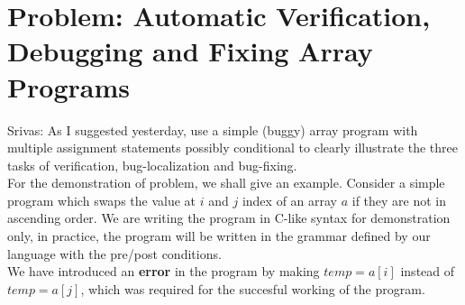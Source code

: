 \documentclass[a4paper, 12pt, notitlepage] {article}
\newcommand{\mscmt}[1]{{\color{blue} \tiny{Srivas: {#1}}}}
\begin{document}
\section {Problem: Automatic Verification, Debugging and Fixing Array Programs}
\mscmt{As I suggested yesterday, use a simple (buggy) array program with multiple assignment statements possibly conditional to clearly illustrate the three tasks of verification, bug-localization and bug-fixing.}\\
For the demonstration of problem, we shall give an example. Consider a simple program which swaps the value at $i$ and $j$ index of an array $a$ if they are not in ascending order. We are writing the program in C-like syntax for demonstration only, in practice, the program will be written in the grammar defined by our language with the pre/post conditions. \\
We have introduced an {\bf error } in the program by making $temp = a[i]$ instead of $temp=a[j]$, which was required for the succesful working of the program.\\ 
\end{document}
